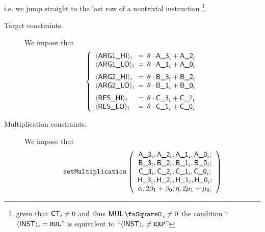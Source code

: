 \begin{center}
\end{center}
i.e. we jump straight to the last row of a nontrivial  instruction%
\footnote{given that $\textsf{CT}_{i} \neq 0$ and thus $\mulStamp_{i}\neq0$ the condition ``$\langle{}\textsf{INST}\rangle{}_{i} = \texttt{MUL}$'' is equivalent to ``$\langle{}\textsf{INST}\rangle{}_{i} \neq \texttt{EXP}$''}.
\begin{description}
	\item[Target constraints.] We impose that
		\[
			\left\{ \begin{array}{lcl}
				\iArgOneHi _{i} & \!\!\! = \!\!\! & \theta \cdot \col{A\_3}_{i} + \col{A\_2}_{i}              \\
				\iArgOneLo _{i} & \!\!\! = \!\!\! & \theta \cdot \col{A\_1}_{i} + \col{A\_0}_{i} \vspace{2mm} \\
				\iArgTwoHi _{i} & \!\!\! = \!\!\! & \theta \cdot \col{B\_3}_{i} + \col{B\_2}_{i}              \\
				\iArgTwoLo _{i} & \!\!\! = \!\!\! & \theta \cdot \col{B\_1}_{i} + \col{B\_0}_{i} \vspace{2mm} \\
				\iResHi    _{i} & \!\!\! = \!\!\! & \theta \cdot \col{C\_3}_{i} + \col{C\_2}_{i}              \\
				\iResLo    _{i} & \!\!\! = \!\!\! & \theta \cdot \col{C\_1}_{i} + \col{C\_0}_{i}              \\
			\end{array} \right.
		\]
	\item[Multiplication constraints.] We impose that
		\[
			\texttt{setMultiplication}
			\left( \begin{array}{c}
				\textsf{A\_3}_{i}, \textsf{A\_2}_{i}, \textsf{A\_1}_{i}, \textsf{A\_0}_{i}; \\
				\textsf{B\_3}_{i}, \textsf{B\_2}_{i}, \textsf{B\_1}_{i}, \textsf{B\_0}_{i}; \\
				\textsf{C\_3}_{i}, \textsf{C\_2}_{i}, \textsf{C\_1}_{i}, \textsf{C\_0}_{i}; \\
				\textsf{H\_3}_{i}, \textsf{H\_2}_{i}, \textsf{H\_1}_{i}, \textsf{H\_0}_{i}; \\
				\alpha, 2\beta_{1} + \beta_{0};
				\eta, 2\mu_{1} + \mu_{0}; \\
			\end{array} \right)
		\]
\end{description}
